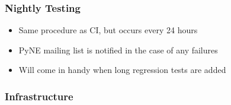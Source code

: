 \documentclass[12pt]{beamer}
\begin{document}
\begin{frame}
\frametitle{Nightly Testing}

\begin{itemize}
\item{Same procedure as CI, but occurs every 24 hours}
\item{PyNE mailing list is notified in the case of any failures}
\item{Will come in handy when long regression tests are added}
\end{itemize}


\end{frame}

\begin{frame}
\frametitle{Infrastructure}


\end{frame}
\end{document}
